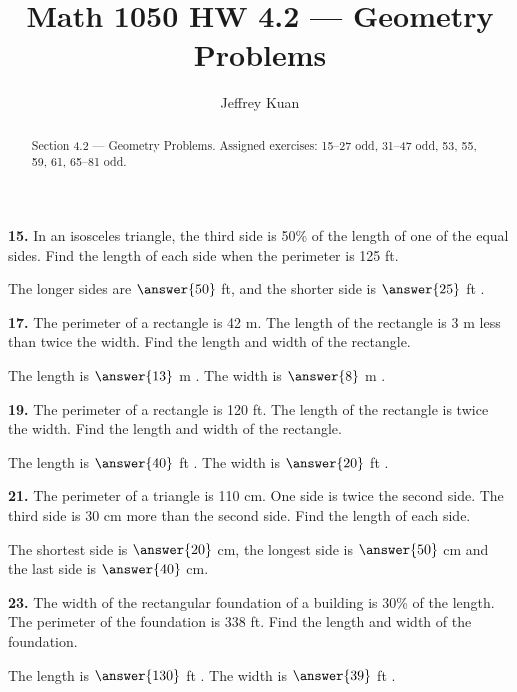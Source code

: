 \documentclass{ximera}
\author{Jeffrey Kuan}
\title{Math 1050 HW 4.2 --- Geometry Problems}
\begin{document}
\begin{abstract}
    Section 4.2 --- Geometry Problems.
    Assigned exercises: 15–27 odd, 31–47 odd, 53, 55, 59, 61, 65–81 odd.
\end{abstract}

\maketitle

\begin{problem}
\textbf{15.} In an isosceles triangle, the third side is 50\% of the length of one of the
  equal sides. Find the length of each side when the perimeter is 125 ft.

The longer sides are $\answer{50}$ ft, and the shorter side is $\answer{25}$ ft .
\end{problem}

\begin{problem}
\textbf{17.} The perimeter of a rectangle is 42 m. The length of the rectangle is 3 m less
  than twice the width. Find the length and width of the rectangle.

The length is $\answer{13}$ m . The width is $\answer{8}$ m .
\end{problem}

\begin{problem}
\textbf{19.} The perimeter of a rectangle is 120 ft. The length of the rectangle is twice the
  width. Find the length and width of the rectangle.

The length is $\answer{40}$ ft . The width is $\answer{20}$ ft .
\end{problem}

\begin{problem}
\textbf{21.} The perimeter of a triangle is 110 cm. One side is twice the second side. The
  third side is 30 cm more than the second side. Find the length of each side.

The shortest side is $\answer{20}$ cm, the longest side is $\answer{50}$ cm and the last side is $\answer{40}$ cm.
\end{problem}

\begin{problem}
\textbf{23.} The width of the rectangular foundation of a building is 30\% of the length. The
  perimeter of the foundation is 338 ft. Find the length and width of the foundation.

The length is $\answer{130}$ ft . The width is $\answer{39}$ ft .
\end{problem}
\end{document}
